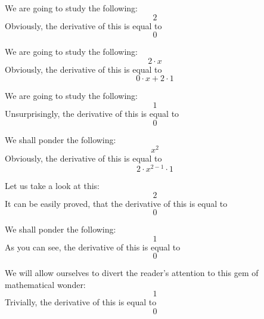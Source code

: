 \documentclass{article}
\begin{document}
We are going to study the following:
\begin{equation}
2 
\end{equation}
Obviously, the derivative of this is equal to
\begin{equation}
0 
\end{equation}

We are going to study the following:
\begin{equation}
2 \cdot x 
\end{equation}
Obviously, the derivative of this is equal to
\begin{equation}
0 \cdot x + 2 \cdot 1 
\end{equation}

We are going to study the following:
\begin{equation}
1 
\end{equation}
Unsurprisingly, the derivative of this is equal to
\begin{equation}
0 
\end{equation}

We shall ponder the following:
\begin{equation}
x ^{2 } 
\end{equation}
Obviously, the derivative of this is equal to
\begin{equation}
2 \cdot x ^{2 - 1 } \cdot 1 
\end{equation}

Let us take a look at this:
\begin{equation}
2 
\end{equation}
It can be easily proved, that the derivative of this is equal to
\begin{equation}
0 
\end{equation}

We shall ponder the following:
\begin{equation}
1 
\end{equation}
As you can see, the derivative of this is equal to
\begin{equation}
0 
\end{equation}

We will allow ourselves to divert the reader's attention to this gem of mathematical wonder:
\begin{equation}
1 
\end{equation}
Trivially, the derivative of this is equal to
\begin{equation}
0 
\end{equation}
\end{document}
